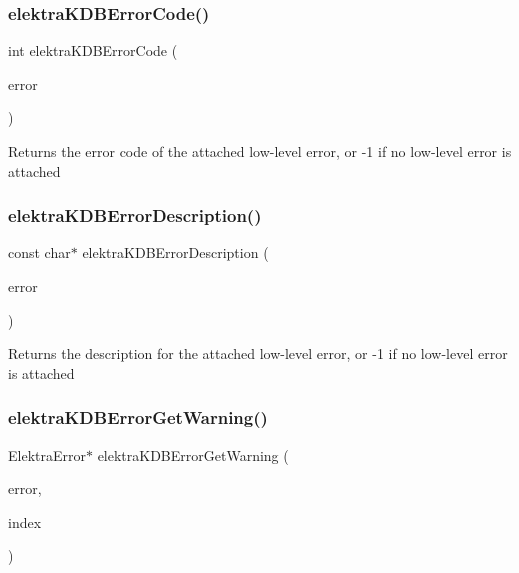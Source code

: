 \subsubsection{\texorpdfstring{elektra\+K\+D\+B\+Error\+Code()}{elektraKDBErrorCode()}}
{\footnotesize\ttfamily int elektra\+K\+D\+B\+Error\+Code (\begin{DoxyParamCaption}\item[{const Elektra\+Error $\ast$}]{error }\end{DoxyParamCaption})}

\begin{DoxyReturn}{Returns}
the error code of the attached low-\/level error, or -\/1 if no low-\/level error is attached 
\end{DoxyReturn}
\mbox{\label{group__highlevel_ga5aab7f481b5c7fc7db0ee5909e6d6863}} 
\subsubsection{\texorpdfstring{elektra\+K\+D\+B\+Error\+Description()}{elektraKDBErrorDescription()}}
{\footnotesize\ttfamily const char$\ast$ elektra\+K\+D\+B\+Error\+Description (\begin{DoxyParamCaption}\item[{const Elektra\+Error $\ast$}]{error }\end{DoxyParamCaption})}

\begin{DoxyReturn}{Returns}
the description for the attached low-\/level error, or -\/1 if no low-\/level error is attached 
\end{DoxyReturn}
\mbox{\label{group__highlevel_ga17540583cef8fbedb1536e5cbb704539}} 
\subsubsection{\texorpdfstring{elektra\+K\+D\+B\+Error\+Get\+Warning()}{elektraKDBErrorGetWarning()}}
{\footnotesize\ttfamily Elektra\+Error$\ast$ elektra\+K\+D\+B\+Error\+Get\+Warning (\begin{DoxyParamCaption}\item[{const Elektra\+Error $\ast$}]{error,  }\item[{int}]{index }\end{DoxyParamCaption})}

